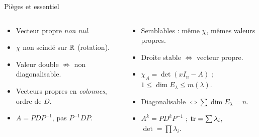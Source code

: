 \documentclass[aspectratio=169,10pt]{beamer}
\begin{document}
\begin{frame}{Pièges et essentiel}
\begin{columns}[T]
\begin{PIEGE}
\begin{itemize}
\item Vecteur propre \emph{non nul}.
\item $\chi$ non scindé sur $\mathbb{R}$ (rotation).
\item Valeur double $\not\Rightarrow$ non diagonalisable.
\item Vecteurs propres en \emph{colonnes}, ordre de $D$.
\item $A=PDP^{-1}$, pas $P^{-1}DP$.
\end{itemize}
\end{PIEGE}
\begin{RETENIR}
\begin{itemize}
\item Semblables : même $\chi$, mêmes valeurs propres.
\item Droite stable $\iff$ vecteur propre.
\item $\chi_A=\det(xI_n-A)$ ; $1\leq\dim E_\lambda\leq m(\lambda)$.
\item Diagonalisable $\iff\sum\dim E_\lambda=n$.
\item $A^k=PD^kP^{-1}$ ; $\operatorname{tr}=\sum\lambda_i$, $\det=\prod\lambda_i$.
\end{itemize}
\end{RETENIR}
\end{columns}
\end{frame}
\end{document}
